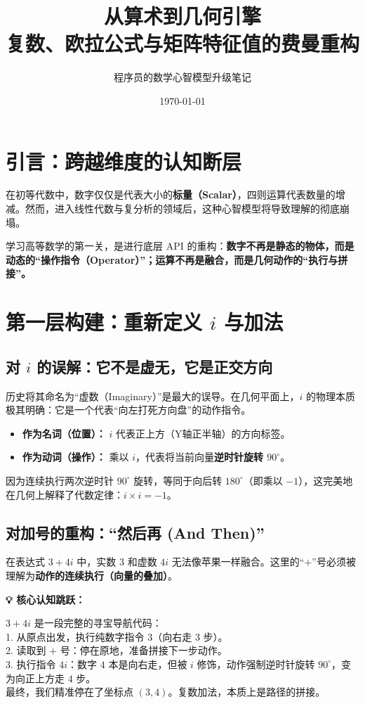 \documentclass[12pt, a4paper]{article}
\title{\textbf{\Huge 从算术到几何引擎}\\ \vspace{0.5em} \Large 复数、欧拉公式与矩阵特征值的费曼重构}
\author{程序员的数学心智模型升级笔记}
\date{\today}
\newenvironment{insight}{
    \def\FrameCommand{\fboxsep=1em\colorbox{graybg}}
    \MakeFramed{\advance\hsize-\width\FrameRestore}
    \textbf{\textcolor{primary}{\large 💡 核心认知跳跃：}} \par\vspace{0.5em}
}{
    \endMakeFramed
}
\begin{document}
\maketitle
\tableofcontents
\newpage

\section{引言：跨越维度的认知断层}
在初等代数中，数字仅仅是代表大小的\textbf{标量（Scalar）}，四则运算代表数量的增减。然而，进入线性代数与复分析的领域后，这种心智模型将导致理解的彻底崩塌。

学习高等数学的第一关，是进行底层 API 的重构：\textbf{数字不再是静态的物体，而是动态的“操作指令（Operator）”；运算不再是融合，而是几何动作的“执行与拼接”。}

\section{第一层构建：重新定义 $i$ 与加法}

\subsection{对 $i$ 的误解：它不是虚无，它是正交方向}
历史将其命名为“虚数（Imaginary）”是最大的误导。在几何平面上，$i$ 的物理本质极其明确：它是一个代表“向左打死方向盘”的动作指令。

\begin{itemize}
    \item \textbf{作为名词（位置）：} $i$ 代表正上方（Y轴正半轴）的方向标签。
    \item \textbf{作为动词（操作）：} 乘以 $i$，代表将当前向量\textbf{逆时针旋转 $90^\circ$}。
\end{itemize}

因为连续执行两次逆时针 $90^\circ$ 旋转，等同于向后转 $180^\circ$（即乘以 $-1$），这完美地在几何上解释了代数定律：$i \times i = -1$。

\subsection{对加号的重构：“然后再 (And Then)”}
在表达式 $3 + 4i$ 中，实数 $3$ 和虚数 $4i$ 无法像苹果一样融合。这里的“$+$”号必须被理解为\textbf{动作的连续执行（向量的叠加）}。

\begin{insight}
    $3 + 4i$ 是一段完整的寻宝导航代码：\\
    1. 从原点出发，执行纯数字指令 $3$（向右走 $3$ 步）。\\
    2. 读取到 $+$ 号：停在原地，准备拼接下一步动作。\\
    3. 执行指令 $4i$：数字 $4$ 本是向右走，但被 $i$ 修饰，动作强制逆时针旋转 $90^\circ$，变为向正上方走 $4$ 步。\\
    最终，我们精准停在了坐标点 $(3, 4)$。复数加法，本质上是路径的拼接。
\end{insight}
\end{document}
